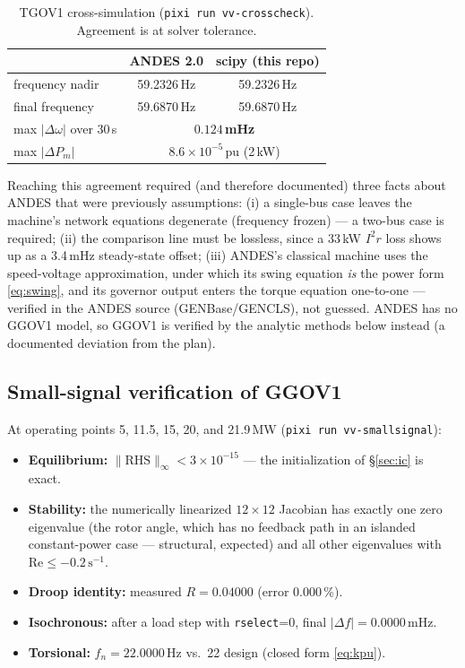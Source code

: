 \documentclass[11pt]{article}
\newcommand{\pu}{\,\text{pu}}
\begin{document}
\begin{table}[h]\centering
\begin{tabular}{lcc}
\toprule
 & ANDES 2.0 & scipy (this repo) \\
\midrule
frequency nadir & 59.2326\,Hz & 59.2326\,Hz \\
final frequency & 59.6870\,Hz & 59.6870\,Hz \\
max $|\Delta\omega|$ over 30\,s & \multicolumn{2}{c}{$\mathbf{0.124}$\,\textbf{mHz}} \\
max $|\Delta P_m|$ & \multicolumn{2}{c}{$8.6\times10^{-5}\pu$ (2\,kW)} \\
\bottomrule
\end{tabular}
\caption{TGOV1 cross-simulation (\texttt{pixi run vv-crosscheck}).
Agreement is at solver tolerance.}
\end{table}

Reaching this agreement required (and therefore documented) three facts
about ANDES that were previously assumptions: (i) a single-bus case leaves
the machine's network equations degenerate (frequency frozen) --- a two-bus
case is required; (ii) the comparison line must be lossless, since a
$33$\,kW $I^2r$ loss shows up as a 3.4\,mHz steady-state offset; (iii)
ANDES's classical machine uses the speed-voltage approximation, under
which its swing equation \emph{is} the power form \eqref{eq:swing}, and
its governor output enters the torque equation one-to-one --- verified in
the ANDES source (GENBase/GENCLS), not guessed. ANDES has no GGOV1 model,
so GGOV1 is verified by the analytic methods below instead (a documented
deviation from the plan).

\subsection{Small-signal verification of GGOV1}
At operating points 5, 11.5, 15, 20, and 21.9\,MW
(\texttt{pixi run vv-smallsignal}):
\begin{itemize}[nosep]
\item \textbf{Equilibrium:} $\lVert \text{RHS} \rVert_\infty <
  3\times10^{-15}$ --- the initialization of \S\ref{sec:ic} is exact.
\item \textbf{Stability:} the numerically linearized $12\times12$ Jacobian
  has exactly one zero eigenvalue (the rotor angle, which has no feedback
  path in an islanded constant-power case --- structural, expected) and
  all other eigenvalues with $\text{Re} \le -0.2\,\text{s}^{-1}$.
\item \textbf{Droop identity:} measured $R = 0.04000$ (error 0.000\,\%).
\item \textbf{Isochronous:} after a load step with \texttt{rselect}=0,
  final $|\Delta f| = 0.0000$\,mHz.
\item \textbf{Torsional:} $f_n = 22.0000$\,Hz vs.\ 22 design (closed form
  \eqref{eq:kpu}).
\end{itemize}
\end{document}
